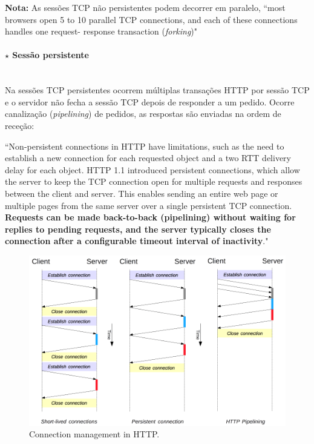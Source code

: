 \vspace{0.6 em}
\noindent\textbf{Nota:} As sessões TCP não persistentes podem decorrer em paralelo, ``most browsers open 5 to 10 parallel TCP connections, and each of these connections handles one request-
response transaction (\textit{forking})"

\paragraph[2.2.2.2 Sessão persistente]{$\pmb{\star}$ Sessão persistente}\mbox{}\\[4pt]
\noindent Na sessões TCP persistentes ocorrem múltiplas transações HTTP por sessão TCP e o servidor não fecha a sessão TCP depois de responder a um pedido. Ocorre canalização (\textit{pipelining}) de pedidos, as respostas são enviadas na ordem de receção:

\vspace{1 em}
\begin{mdframed}
    ``Non-persistent connections in HTTP have limitations, such as the need to establish a new connection for each requested object and a two RTT delivery delay for each object. HTTP 1.1 introduced persistent connections, which allow the server to keep the TCP connection open for multiple requests and responses between the client and server. This enables sending an entire web page or multiple pages from the same server over a single persistent TCP connection. \textbf{Requests can be made back-to-back (pipelining) without waiting for replies to pending requests, and the server typically closes the connection after a configurable timeout interval of inactivity}."
\end{mdframed}

\begin{figure}[H]
    \centering
    \includegraphics[width = 0.9\linewidth]{img/2/http-connections-example.png}
    \caption{Connection management in HTTP.}
    \label{fig:http-connection-example}
\end{figure}

